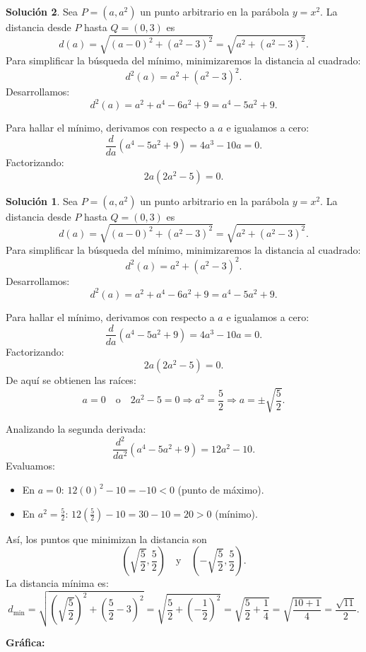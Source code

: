 \documentclass{article}
\theoremstyle{definition}
\newtheorem*{solution}{Solución}
\begin{document}
\begin{solution}
Sea \( P=(a, a^2) \) un punto arbitrario en la parábola \( y=x^2 \). La distancia desde \( P \) hasta \( Q=(0,3) \) es
\[
d(a)=\sqrt{(a-0)^2+(a^2-3)^2} = \sqrt{a^2+(a^2-3)^2}.
\]
Para simplificar la búsqueda del mínimo, minimizaremos la distancia al cuadrado:
\[
d^2(a)=a^2+(a^2-3)^2.
\]
Desarrollamos:
\[
d^2(a)=a^2 + a^4-6a^2+9 = a^4-5a^2+9.
\]

Para hallar el mínimo, derivamos con respecto a \( a \) e igualamos a cero:
\[
\frac{d}{da}\left(a^4-5a^2+9\right)=4a^3-10a=0.
\]
Factorizando:
\[
2a(2a^2-5)=0.
\]\begin{solution}
    Sea \( P=(a, a^2) \) un punto arbitrario en la parábola \( y=x^2 \). La distancia desde \( P \) hasta \( Q=(0,3) \) es
    \[
    d(a)=\sqrt{(a-0)^2+(a^2-3)^2} = \sqrt{a^2+(a^2-3)^2}.
    \]
    Para simplificar la búsqueda del mínimo, minimizaremos la distancia al cuadrado:
    \[
    d^2(a)=a^2+(a^2-3)^2.
    \]
    Desarrollamos:
    \[
    d^2(a)=a^2 + a^4-6a^2+9 = a^4-5a^2+9.
    \]
    
    Para hallar el mínimo, derivamos con respecto a \( a \) e igualamos a cero:
    \[
    \frac{d}{da}\left(a^4-5a^2+9\right)=4a^3-10a=0.
    \]
    Factorizando:
    \[
    2a(2a^2-5)=0.
    \]
    De aquí se obtienen las raíces:
    \[
    a=0 \quad \text{o} \quad 2a^2-5=0 \Longrightarrow a^2=\frac{5}{2} \Longrightarrow a=\pm\sqrt{\frac{5}{2}}.
    \]
    
    Analizando la segunda derivada:
    \[
    \frac{d^2}{da^2}\left(a^4-5a^2+9\right)=12a^2-10.
    \]
    Evaluamos:
    \begin{itemize}
        \item En \( a=0 \): \( 12(0)^2-10=-10<0 \) (punto de máximo).
        \item En \( a^2=\frac{5}{2} \): \( 12\left(\frac{5}{2}\right)-10=30-10=20>0 \) (mínimo).
    \end{itemize}
    
    Así, los puntos que minimizan la distancia son
    \[
    \left(\sqrt{\frac{5}{2}}, \frac{5}{2}\right) \quad \text{y} \quad \left(-\sqrt{\frac{5}{2}}, \frac{5}{2}\right).
    \]
    La distancia mínima es:
    \[
    d_{\min} = \sqrt{\left(\sqrt{\frac{5}{2}}\right)^2+\left(\frac{5}{2}-3\right)^2} 
    = \sqrt{\frac{5}{2}+\left(-\frac{1}{2}\right)^2} 
    = \sqrt{\frac{5}{2}+\frac{1}{4}}
    = \sqrt{\frac{10+1}{4}} = \frac{\sqrt{11}}{2}.
    \]
    
    \medskip
    
    \textbf{Gráfica:}
    

\end{solution}
\end{solution}
\end{document}
